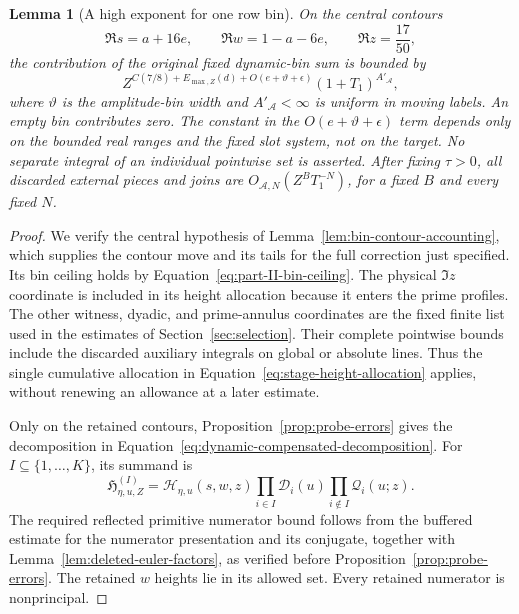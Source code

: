 \documentclass[11pt,a4paper]{article}
\numberwithin{equation}{section}
\numberwithin{figure}{section}
\newtheorem{lemma}[theorem]{Lemma}
\theoremstyle{definition}
\theoremstyle{remark}
\begin{document}
\begin{lemma}[A high exponent for one row bin]
On the central contours
\[
 \Re s=a+16e,\qquad \Re w=1-a-6e,\qquad \Re z=\frac{17}{50},
\]
the contribution of the original fixed dynamic-bin sum is bounded by
\[
 Z^{C(7/8)+E_{\max,Z}(d)+O(e+\vartheta+\epsilon)}
 (1+T_1)^{A'_{\mathcal A}},
\]
where \(\vartheta\) is the amplitude-bin width and
\(A'_{\mathcal A}<\infty\) is uniform in moving labels.  An empty bin
contributes zero.  The constant in the \(O(e+\vartheta+\epsilon)\) term
depends only on the bounded real ranges and the fixed slot system, not on
the target.  No separate integral of an individual pointwise set is
asserted.  After fixing \(\tau>0\), all discarded external pieces and joins
are \(O_{\mathcal A,N}(Z^B T_1^{-N})\), for a fixed \(B\) and every fixed
\(N\).
\end{lemma}

\begin{proof}
We verify the central hypothesis of
Lemma~\ref{lem:bin-contour-accounting}, which supplies the contour
move and its tails for the full correction just specified.  Its bin
ceiling holds by Equation~\eqref{eq:part-II-bin-ceiling}.  The physical
\(\Im z\) coordinate is included in its height allocation because it
enters the prime profiles.  The other witness, dyadic, and prime-annulus
coordinates are the fixed finite list used in the estimates of
Section~\ref{sec:selection}.  Their complete pointwise bounds include the
discarded auxiliary integrals on global or absolute lines.  Thus the
single cumulative allocation in Equation~\eqref{eq:stage-height-allocation}
applies, without renewing an allowance at a later estimate.

Only on the retained contours, Proposition~\ref{prop:probe-errors} gives
the decomposition in Equation~\eqref{eq:dynamic-compensated-decomposition}.
For \(I\subseteq\{1,\ldots,K\}\), its summand is
\[
 \mathfrak H_{\eta,u,Z}^{(I)}
 =\mathcal H_{\eta,u}(s,w,z)
       \prod_{i\in I}\mathcal D_i(u)
       \prod_{i\notin I}\mathcal Q_i(u;z).
\]
The required reflected primitive numerator bound follows from the
buffered estimate for the numerator presentation and its conjugate,
together with Lemma~\ref{lem:deleted-euler-factors}, as verified before
Proposition~\ref{prop:probe-errors}.  The retained \(w\) heights lie
in its allowed set.  Every retained numerator is nonprincipal.


\end{proof}
\end{document}
